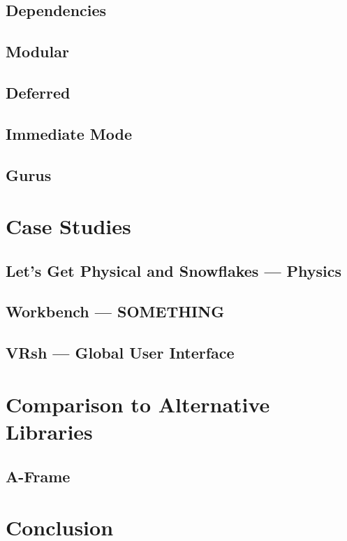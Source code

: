 \documentclass[conference,12pt]{IEEEtran}
\newcommand\name{VRsh}
\begin{document}
\subsection{Dependencies}

\subsection{Modular}

\subsection{Deferred}

\subsection{Immediate Mode}

\subsection{Gurus} %


\section{Case Studies}

\subsection{Let's Get Physical and Snowflakes --- Physics}

\subsection{Workbench --- SOMETHING} %

\subsection{{\name} --- Global User Interface}

\section{Comparison to Alternative Libraries}

\subsection{A-Frame}

\section{Conclusion}

{\printbibliography}
\end{document}

